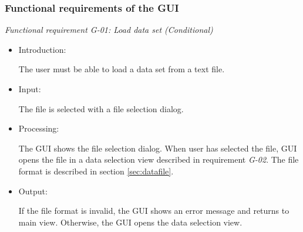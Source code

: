 \documentclass[a4paper,11pt]{article}
\begin{document}
\subsubsection{Functional requirements of the GUI}
\label{sec:guireq}


\noindent \emph{Functional requirement G-01: Load data set (Conditional)}
\begin{itemize}
\item Introduction:

The user must be able to load a data set from a text file.
\item Input:

The file is selected with a file selection dialog.
\item Processing:

The GUI shows the file selection dialog. When user has selected the file, GUI opens the file in a data selection
view described in requirement \emph{G-02}. The file format is described in section \ref{sec:datafile}. 
\item Output:

If the file format is invalid, the GUI shows an error message and returns to main view. Otherwise, the GUI opens
the data selection view.
\end{itemize}
\end{document}
